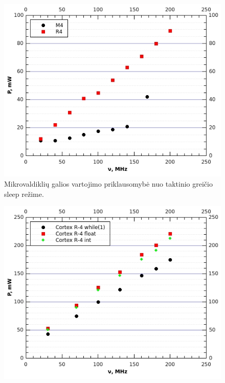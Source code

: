 \documentclass[a4paper, 12pt]{article} %
\begin{document}
\begin{onehalfspacing}
\begin{figure}[H]
\includegraphics[scale=0.8]{pav/sleep.jpg} %
\captionsetup{labelformat=numbfirst} %
\captionsetup{labelseparator=tarpas}
\caption{Mikrovaldikli\k{u} galios vartojimo priklausomyb\.e nuo taktinio grei\v{c}io sleep re\v{z}ime.}
\label{vienas}
\end{figure}
\begin{figure}[H] %
\centering %
\includegraphics[scale=0.8]{pav/R4galia.jpg} %

\end{figure}
\end{onehalfspacing}
\end{document}
